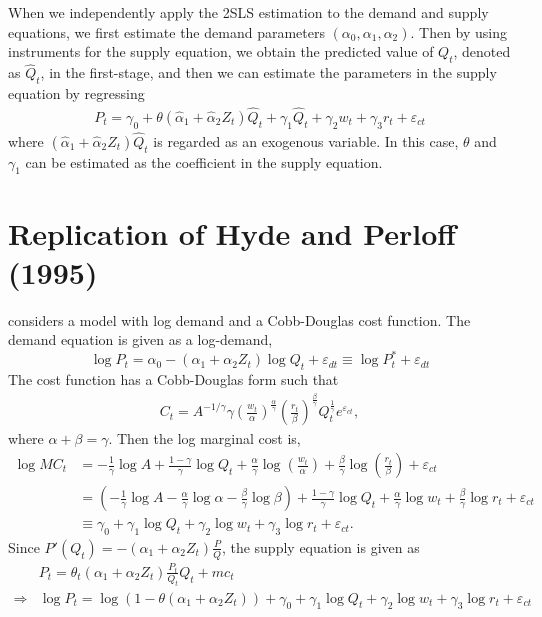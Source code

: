 \documentclass[11pt, a4paper]{article}
\numberwithin{figure}{section}
\theoremstyle{definition}
\newcommand{\0}{\mathbf{0}}
\begin{document}
When we independently apply the 2SLS estimation to the demand and supply equations, we first estimate the demand parameters $(\alpha_0, \alpha_1, \alpha_2)$. Then by using instruments for the supply equation, we obtain the predicted value of $Q_t$, denoted as $\hat{Q}_t$, in the first-stage, and then we can estimate the parameters in the supply equation by regressing
\begin{align*}
     P_t = \gamma_0 + \theta(\hat{\alpha}_1 + \hat{\alpha}_2Z_t)\hat{Q}_t+ \gamma_1\hat{Q}_t  + \gamma_2 w_t + \gamma_3 r_t + \varepsilon_{ct}
\end{align*}
where $(\hat{\alpha}_1 + \hat{\alpha}_2Z_t)\hat{Q}_t$ is regarded as an exogenous variable. In this case, $\theta$ and $\gamma_1$ can be estimated as the coefficient in the supply equation.




\section{Replication of Hyde and Perloff (1995)}
\citet{hyde1995can} considers a model with log demand and a Cobb-Douglas cost function. 
The demand equation is given as a log-demand, 
\[\log P_{t} = \alpha_0 - (\alpha_1 + \alpha_2 Z_t) \log Q_t + \varepsilon_{dt} \equiv \log P_t^* + \varepsilon_{dt}\]
The cost function has a Cobb-Douglas form such that 
\begin{align*}
    C_t = A^{-1/\gamma} \gamma \left(\frac{w_t}{\alpha}\right)^{\frac{\alpha}{\gamma}} \left(\frac{r_t}{\beta}\right)^{\frac{\beta}{\gamma}} Q_t^{\frac{1}{\gamma}}e^{\varepsilon_{ct}},
\end{align*}
where $\alpha + \beta = \gamma$.
Then the log marginal cost is,
\begin{align*}
    \log MC_t &= -\frac{1}{\gamma}\log A + \frac{1-\gamma}{\gamma}\log Q_t + \frac{\alpha}{\gamma} \log \left(\frac{w_t}{\alpha}\right) + \frac{\beta}{\gamma} \log \left(\frac{r_t}{\beta}\right) + \varepsilon_{ct}\\
        & = \left( -\frac{1}{\gamma}\log A - \frac{\alpha}{\gamma}\log \alpha -  \frac{\beta}{\gamma}\log\beta    \right) + \frac{1-\gamma}{\gamma}\log Q_t + \frac{\alpha}{\gamma} \log w_t + \frac{\beta}{\gamma} \log r_t + \varepsilon_{ct} \\
        &\equiv \gamma_0 + \gamma_1 \log Q_t +  \gamma_2 \log w_t + \gamma_3 \log r_t + \varepsilon_{ct}.
\end{align*}
Since $P'(Q_t) = - (\alpha_1 + \alpha_2 Z_t) \frac{P}{Q} $,  the supply equation is given as
\begin{align*}
    &P_t = \theta_t (\alpha_1 + \alpha_2 Z_t) \frac{P_t}{Q_t} Q_t + mc_t\\
    \Longrightarrow &\log P_t  = \log(1 - \theta(\alpha_1 + \alpha_2 Z_t)) + \gamma_0 + \gamma_1 \log Q_t +  \gamma_2 \log w_t + \gamma_3 \log r_t + \varepsilon_{ct}
\end{align*}
\end{document}
